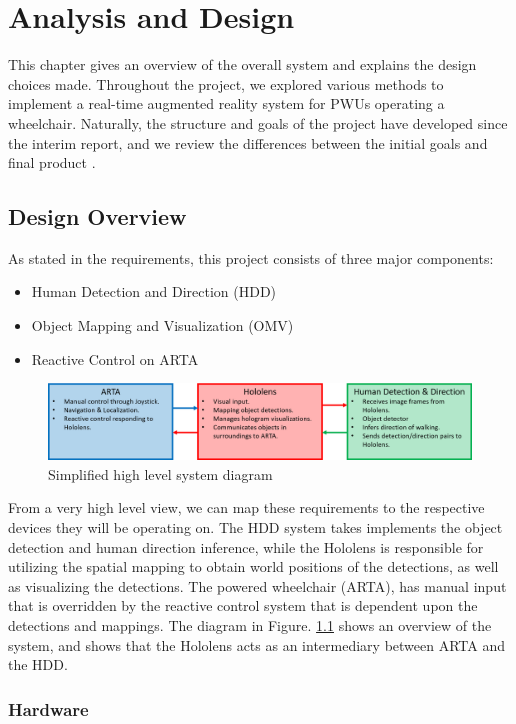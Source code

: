 \chapter{Analysis and Design}
This chapter gives an overview of the overall system and explains the design choices made. Throughout the project, we explored various methods to implement a real-time augmented reality system for PWUs operating a wheelchair. Naturally, the structure and goals of the project have developed since the interim report, and we review the differences between the initial goals and final product .

\section{Design Overview}
As stated in the requirements, this project consists of three major components:
\begin{itemize}
	\item Human Detection and Direction (HDD)
	\item Object Mapping and Visualization (OMV)
	\item Reactive Control on ARTA
\end{itemize}

\begin{figure}[ht]
	\centering
	\includegraphics[width=1.0\linewidth]{img/chapter4_analysis/simpleSystemDiagram.png}
	\caption{Simplified high level system diagram}
	\label{fig:simplifiedHL}
\end{figure}

From a very high level view, we can map these requirements to the respective devices they will be operating on. The HDD system takes implements the object detection and human direction inference, while the Hololens is responsible for utilizing the spatial mapping to obtain world positions of the detections, as well as visualizing the detections. The powered wheelchair (ARTA), has manual input that is overridden by the reactive control system that is dependent upon the detections and mappings. The diagram in Figure. \ref{fig:simplifiedHL} shows an overview of the system, and shows that the Hololens acts as an intermediary between ARTA and the HDD.

\subsection{Hardware}

